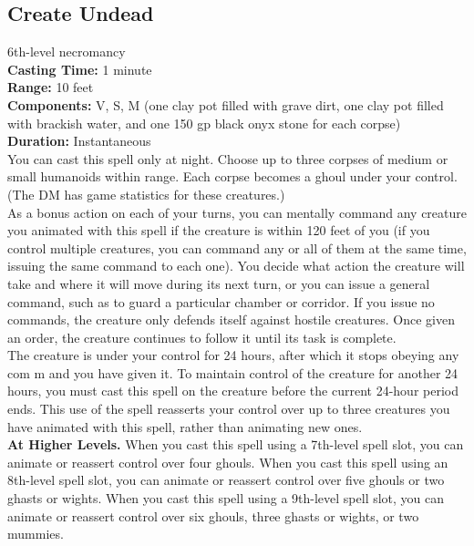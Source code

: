 \documentclass[11pt, A4paper, english]{article}
\begin{document}
		\subsection{Create Undead}
6th-level necromancy \\
\textbf{Casting Time:} 1 minute \\
\textbf{Range:} 10 feet \\
\textbf{Components:} V, S, M (one clay pot filled with grave dirt, one clay pot filled with brackish water, and one 150 gp black onyx stone for each corpse) \\
\textbf{Duration:} Instantaneous \\
You can cast this spell only at night. Choose up to three corpses of medium or small humanoids within range. Each corpse becomes a ghoul under your control. (The DM has game statistics for these creatures.) \\
As a bonus action on each of your turns, you can mentally command any creature you animated with this spell if the creature is within 120 feet of you (if you control multiple creatures, you can command any or all of them at the same time, issuing the same command to each one). You decide what action the creature will take and where it will move during its next turn, or you can issue a general command, such as to guard a particular chamber or corridor. If you issue no commands, the creature only defends itself against hostile creatures. Once given an order, the creature continues to follow it until its task is complete. \\
The creature is under your control for 24 hours, after which it stops obeying any com m and you have given it. To maintain control of the creature for another 24 hours, you must cast this spell on the creature before the current 24-hour period ends. This use of the spell reasserts your control over up to three creatures you have animated with this spell, rather than animating new ones. \\
\textbf{At Higher Levels.} When you cast this spell using a 7th-level spell slot, you can animate or reassert control over four ghouls. When you cast this spell using an 8th-level spell slot, you can animate or reassert control over five ghouls or two ghasts or wights. When you cast this spell using a 9th-level spell slot, you can animate or reassert control over six ghouls, three ghasts or wights, or two mummies.
\end{document}
